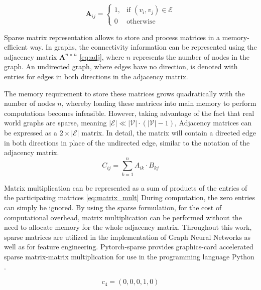\begin{equation}
    \mathbf{A}_{ij}  =\begin{cases} 
    1,& \text{if } (v_i,v_j) \in \mathcal{E}\\
    0              & \text{otherwise}
    \end{cases}
    \label{eq:adj}
\end{equation}



Sparse matrix representation allows to store and process matrices in a memory-efficient way. In graphs, the connectivity information can be represented using the adjacency matrix $\mathbf{A}^{n \times n}$ \eqref{eq:adj}, where $n$ represents the number of nodes in the graph. An undirected graph, where edges have no direction, is denoted with entries for edges in both directions in the adjacency matrix. 


The memory requirement to store these matrices grows quadratically with the number of nodes $n$, whereby loading these matrices into main memory to perform computations becomes infeasible. However, taking advantage of the fact that real world graphs are sparse, meaning $|\mathcal{E}| \ll |\mathcal{V}| \cdot (|\mathcal{V}| - 1)$, 
Adjacency matrices can be expressed as a $2 \times |\mathcal{E}| $ matrix. In detail, the matrix will contain a directed edge in both directions in place of the undirected edge, similar to the notation of the adjacency matrix.
\begin{equation}
C_{ij} = \sum_{k=1}^{n} A_{ik} \cdot B_{kj} \label{eq:matrix_mult}
\end{equation}


Matrix multiplication can be represented as a sum of products of the entries of the participating matrices \eqref{eq:matrix_mult} During computation, the zero entries can simply be ignored.
By using the sparse formulation, for the cost of computational overhead, matrix multiplication can be performed without the need to allocate memory for the whole adjacency matrix. Throughout this work, sparse matrices are utilized in the implementation of Graph Neural Networks as well as for feature engineering. Pytorch-sparse \parencite{pytorch_sparse} provides graphics-card accelerated sparse matrix-matrix multiplication for use in the programming language Python \parencite{python}.

  \begin{equation}
    c_4 = (0,0,0,1,0) \label{eq:dummy}
  \end{equation}
  
